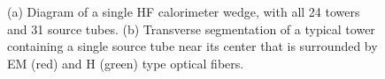\begin{figure}[htb]
   \begin{center}
      \caption{(a) Diagram of a single HF calorimeter wedge, with all 24 towers and 31 source tubes.
               (b) Transverse segmentation of a typical tower containing a single source tube near
                   its center that is surrounded by EM (red) and H (green) type optical fibers.}
      \label{fig:HFWedge_Diagram}
   \end{center}
\end{figure}

